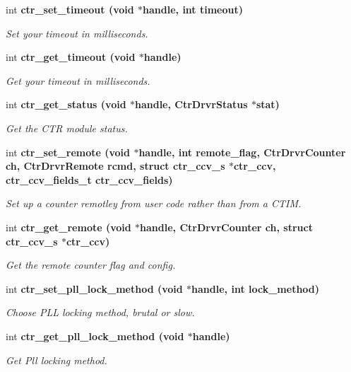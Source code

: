 \begin{CompactItemize}
int \bf{ctr\_\-set\_\-timeout} (void $\ast$handle, int timeout)
\begin{CompactList}\small\item\em Set your timeout in milliseconds. \item\end{CompactList}\item 
int \bf{ctr\_\-get\_\-timeout} (void $\ast$handle)
\begin{CompactList}\small\item\em Get your timeout in milliseconds. \item\end{CompactList}\item 
int \bf{ctr\_\-get\_\-status} (void $\ast$handle, Ctr\-Drvr\-Status $\ast$stat)
\begin{CompactList}\small\item\em Get the CTR module status. \item\end{CompactList}\item 
int \bf{ctr\_\-set\_\-remote} (void $\ast$handle, int remote\_\-flag, Ctr\-Drvr\-Counter ch, Ctr\-Drvr\-Remote rcmd, struct \bf{ctr\_\-ccv\_\-s} $\ast$ctr\_\-ccv, \bf{ctr\_\-ccv\_\-fields\_\-t} ctr\_\-ccv\_\-fields)
\begin{CompactList}\small\item\em Set up a counter remotley from user code rather than from a CTIM. \item\end{CompactList}\item 
int \bf{ctr\_\-get\_\-remote} (void $\ast$handle, Ctr\-Drvr\-Counter ch, struct \bf{ctr\_\-ccv\_\-s} $\ast$ctr\_\-ccv)
\begin{CompactList}\small\item\em Get the remote counter flag and config. \item\end{CompactList}\item 
int \bf{ctr\_\-set\_\-pll\_\-lock\_\-method} (void $\ast$handle, int lock\_\-method)
\begin{CompactList}\small\item\em Choose PLL locking method, brutal or slow. \item\end{CompactList}\item 
int \bf{ctr\_\-get\_\-pll\_\-lock\_\-method} (void $\ast$handle)
\begin{CompactList}\small\item\em Get Pll locking method. \item\end{CompactList}\item 

\end{CompactItemize}
